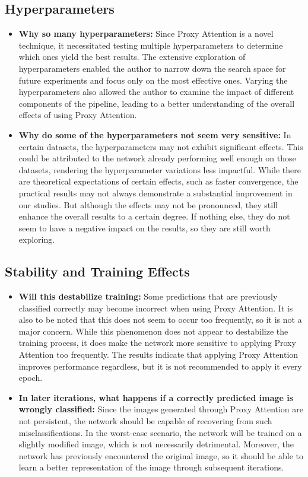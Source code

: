 \documentclass[a4paper,11pt,openright]{book}
\begin{document}
\subsection{Hyperparameters}
\begin{itemize}
    \item \textbf{Why so many hyperparameters: } Since Proxy Attention is a novel technique, it necessitated testing multiple hyperparameters to determine which ones yield the best results. The extensive exploration of hyperparameters enabled the author to narrow down the search space for future experiments and focus only on the most effective ones. Varying the hyperparameters also allowed the author to examine the impact of different components of the pipeline, leading to a better understanding of the overall effects of using Proxy Attention.

    \item \textbf{Why do some of the hyperparameters not seem very sensitive: } In certain datasets, the hyperparameters may not exhibit significant effects. This could be attributed to the network already performing well enough on those datasets, rendering the hyperparameter variations less impactful. While there are theoretical expectations of certain effects, such as faster convergence, the practical results may not always demonstrate a substantial improvement in our studies. But although the effects may not be pronounced, they still enhance the overall results to a certain degree. If nothing else, they do not seem to have a negative impact on the results, so they are still worth exploring.
\end{itemize}

\subsection{Stability and Training Effects}
\begin{itemize}
    \item \textbf{Will this destabilize training: } Some predictions that are previously classified correctly may become incorrect when using Proxy Attention. It is also to be noted that this does not seem to occur too frequently, so it is not a major concern. While this phenomenon does not appear to destabilize the training process, it does make the network more sensitive to applying Proxy Attention too frequently. The results indicate that applying Proxy Attention improves performance regardless, but it is not recommended to apply it every epoch. 

    \item \textbf{In later iterations, what happens if a correctly predicted image is wrongly classified: } Since the images generated through Proxy Attention are not persistent, the network should be capable of recovering from such misclassifications. In the worst-case scenario, the network will be trained on a slightly modified image, which is not necessarily detrimental. Moreover, the network has previously encountered the original image, so it should be able to learn a better representation of the image through subsequent iterations.

\end{itemize}
\end{document}
